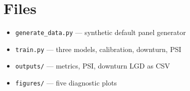 \documentclass[a4paper,11pt]{article}
\begin{document}
\section{Files}

\begin{itemize}
  \item \texttt{generate\_data.py} --- synthetic default panel generator
  \item \texttt{train.py} --- three models, calibration, downturn, PSI
  \item \texttt{outputs/} --- metrics, PSI, downturn LGD as CSV
  \item \texttt{figures/} --- five diagnostic plots
\end{itemize}
\end{document}
